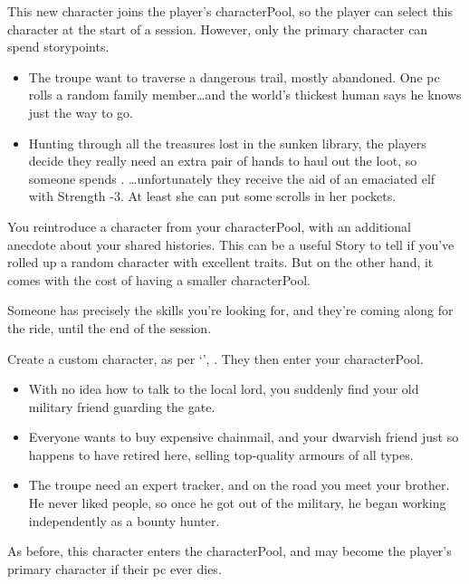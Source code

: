 \begin{multicols}{2}
This new character joins the player's \gls{characterPool}, so the player can select this character at the start of a session.
However, only the primary character can spend \glspl{storypoint}.

\begin{itemize}
  \item
  The troupe want to traverse a dangerous trail, mostly abandoned.
  One \gls{pc} rolls a random family member\ldots and the world's thickest human says he knows just the way to go.
  \item
  Hunting through all the treasures lost in the sunken library, the players decide they really need an extra pair of hands to haul out the loot, so someone spends .
  \ldots unfortunately they receive the aid of an emaciated elf with Strength -3.
  At least she can put some scrolls in her pockets.
\end{itemize}

\label{returnFriend}
You reintroduce a character from your \gls{characterPool}, with an additional anecdote about your shared histories.
This can be a useful Story to tell if you've rolled up a random character with excellent \glspl{trait}.
But on the other hand, it comes with the cost of having a smaller \gls{characterPool}.

\label{designCharacter}
Someone has precisely the skills you're looking for, and they're coming along for the ride, until the end of the session.

Create a custom character, as per `', .
They then enter your \gls{characterPool}.

\begin{itemize}
  \item
  With no idea how to talk to the local lord, you suddenly find your old military friend guarding the gate.
  \item
  Everyone wants to buy expensive chainmail, and your dwarvish friend just so happens to have retired here, selling top-quality armours of all types.
  \item
  The troupe need an expert tracker, and on the road you meet your brother.
  He never liked people, so once he got out of the military, he began working independently as a bounty hunter.
\end{itemize}

As before, this character enters the \gls{characterPool}, and may become the player's primary character if their \gls{pc} ever dies.


\end{multicols}
